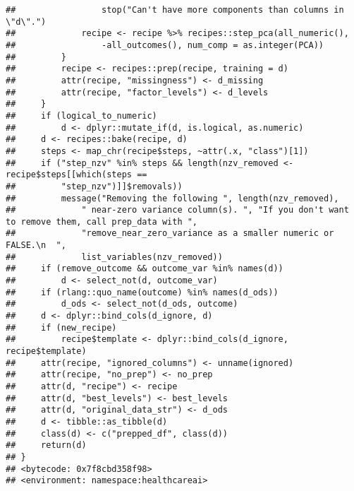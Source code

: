 \documentclass[
]{article}
\newenvironment{Shaded}{\begin{snugshade}}{\end{snugshade}}
\newcommand{\AttributeTok}[1]{\textcolor[rgb]{0.77,0.63,0.00}{#1}}
\newcommand{\ConstantTok}[1]{\textcolor[rgb]{0.00,0.00,0.00}{#1}}
\newcommand{\DecValTok}[1]{\textcolor[rgb]{0.00,0.00,0.81}{#1}}
\newcommand{\FunctionTok}[1]{\textcolor[rgb]{0.00,0.00,0.00}{#1}}
\newcommand{\NormalTok}[1]{#1}
\newcommand{\OtherTok}[1]{\textcolor[rgb]{0.56,0.35,0.01}{#1}}
\newcommand{\SpecialCharTok}[1]{\textcolor[rgb]{0.00,0.00,0.00}{#1}}
\begin{document}
\begin{verbatim}
##                 stop("Can't have more components than columns in \"d\".")
##             recipe <- recipe %>% recipes::step_pca(all_numeric(), 
##                 -all_outcomes(), num_comp = as.integer(PCA))
##         }
##         recipe <- recipes::prep(recipe, training = d)
##         attr(recipe, "missingness") <- d_missing
##         attr(recipe, "factor_levels") <- d_levels
##     }
##     if (logical_to_numeric) 
##         d <- dplyr::mutate_if(d, is.logical, as.numeric)
##     d <- recipes::bake(recipe, d)
##     steps <- map_chr(recipe$steps, ~attr(.x, "class")[1])
##     if ("step_nzv" %in% steps && length(nzv_removed <- recipe$steps[[which(steps == 
##         "step_nzv")]]$removals)) 
##         message("Removing the following ", length(nzv_removed), 
##             " near-zero variance column(s). ", "If you don't want to remove them, call prep_data with ", 
##             "remove_near_zero_variance as a smaller numeric or FALSE.\n  ", 
##             list_variables(nzv_removed))
##     if (remove_outcome && outcome_var %in% names(d)) 
##         d <- select_not(d, outcome_var)
##     if (rlang::quo_name(outcome) %in% names(d_ods)) 
##         d_ods <- select_not(d_ods, outcome)
##     d <- dplyr::bind_cols(d_ignore, d)
##     if (new_recipe) 
##         recipe$template <- dplyr::bind_cols(d_ignore, recipe$template)
##     attr(recipe, "ignored_columns") <- unname(ignored)
##     attr(recipe, "no_prep") <- no_prep
##     attr(d, "recipe") <- recipe
##     attr(d, "best_levels") <- best_levels
##     attr(d, "original_data_str") <- d_ods
##     d <- tibble::as_tibble(d)
##     class(d) <- c("prepped_df", class(d))
##     return(d)
## }
## <bytecode: 0x7f8cbd358f98>
## <environment: namespace:healthcareai>
\end{verbatim}

\begin{Shaded}
\end{Shaded}
\end{document}
